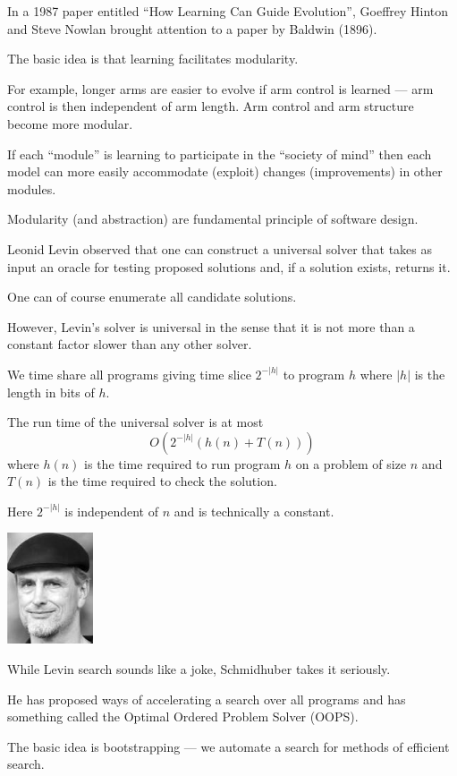 {In a 1987 paper entitled ``How Learning Can Guide Evolution'', Goeffrey Hinton and Steve Nowlan brought attention to a paper by Baldwin (1896).

\vfill
The basic idea is that learning facilitates modularity.

\vfill
For example, longer arms are easier to evolve if arm control is learned --- arm control is then independent of arm length.  Arm control and arm structure become more modular.


\vfill
If each ``module'' is learning to participate in the ``society of mind'' then each model can more easily accommodate (exploit) changes (improvements) in other modules.

\vfill
Modularity (and abstraction) are fundamental principle of software design.


Leonid Levin observed that one can construct a universal solver that takes as input an oracle for testing proposed solutions
and, if a solution exists, returns it.

\vfill
One can of course enumerate all candidate solutions.

  \vfill
However, Levin's solver is universal in the sense that it is not more than a constant factor slower than any other solver.


  
\vfill
We time share all programs giving time slice $2^{-|h|}$ to program $h$ where $|h|$
is the length in bits of $h$.

\vfill
The run time of the universal solver is at most
$$O(2^{-|h|}(h(n) + T(n)))$$
where $h(n)$ is the time required to run program $h$ on a problem of size $n$ and $T(n)$ is the time required to check the solution.

\vfill
Here $2^{-|h|}$ is independent of $n$ and is technically a constant.


\includegraphics[width= 1in]{../images/schmidhuber}

While Levin search sounds like a joke, Schmidhuber takes it seriously.

\vfill
He has proposed ways of accelerating a search over all programs and has something called the Optimal Ordered Problem Solver (OOPS).

\vfill
The basic idea is bootstrapping --- we automate a search for methods of efficient search.


}

